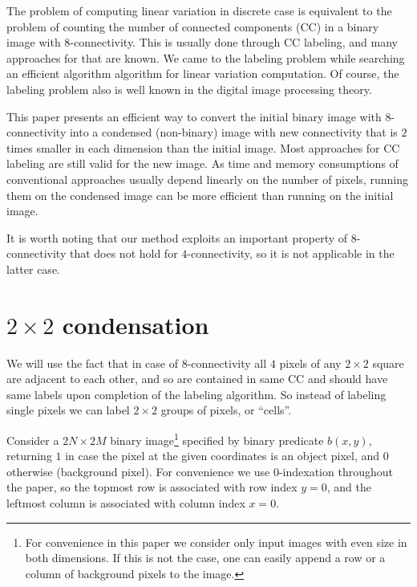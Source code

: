 \documentclass[hidelinks]{llncs}
\newcommand{\texten}[1]{#1}
\newcommand{\textru}[1]{}
\begin{document}
The problem of computing linear variation in discrete case is equivalent to the
problem of counting the number of connected components (CC) in a binary image
with 8-connectivity. This is usually done through CC labeling, and many
approaches for that are known\cite{hechao}. We came to the labeling problem
while searching an efficient algorithm algorithm for linear variation
computation. Of course, the labeling problem also is well known in the digital
image processing theory.


This paper presents an efficient way to convert the initial binary image with
8-connectivity into a condensed (non-binary) image with new connectivity that is
$2$ times smaller in each dimension than the initial image. Most approaches for
CC labeling are still valid for the new image. As time and memory consumptions
of conventional approaches usually depend linearly on the number of pixels,
running them on the condensed image can be more efficient than running on the
initial image.

It is worth noting that our method exploits an important property of
$8$-connectivity that does not hold for $4$-connectivity, so it is not
applicable in the latter case.

\section{$2\times2$ condensation}

\texten{
We will use the fact that in case of 8-connectivity all $4$ pixels of any $2
\times 2$ square are adjacent to each other, and so are contained in same CC and
should have same labels upon completion of the labeling algorithm. So instead of
labeling single pixels we can label $2 \times 2$ groups of pixels, or ``cells''.
}\textru{
Наблюдение: с 8-связностью в любом квадратике $2 \times 2$ любые два пикселя
находятся рядом. Значит если это пара объектных пикселей, то они находятся в
одной КС, и значит каждый такой квадратик пересекается не более чем с одной КС.
Поэтому вместо маркировки отдельных пикселей можно маркировать такие квадраты.
Назовём их клетками.
}


\texten{
Consider a $2N \times 2M$ binary image\footnote{
  For convenience in this paper we consider only input images with even size
  in both dimensions. If this is not the case, one can easily append a row or
  a column of background pixels to the image.
}
specified by binary predicate $b(x, y)$, returning $1$ in case the pixel at the
given coordinates is an object pixel, and $0$ otherwise (background pixel). For
convenience we use 0-indexation throughout the paper, so the topmost row is
associated with row index $y=0$, and the leftmost column is associated with
column index $x=0$.
}\textru{
Рассмотрим бинарное изображение размера $2N \times 2M$\footnote{
  Для удобства мы рассматриваем только изображения с чётной высотой и шириной.
  В общем случае при необходимости можно добавить строку или столбец с фоновыми
  пикселями.
},
заданное предикатом $b(x, y)$, который возвращает $1$, если переданы координаты
объектного пикселя, и $0$ иначе.
Мы везде будем использовать $0$-индексацию: верхняя строка и левый столбец имеют
номер $0$.
}
\end{document}
